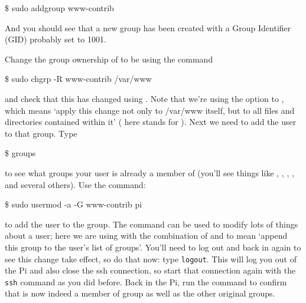 \begin{ttoutenv}
\$ sudo addgroup www-contrib
\end{ttoutenv}

And you should see that a new group has been created with a Group
Identifier (GID) probably set to 1001.

Change the group ownership of  to be
 using the command

\begin{ttoutenv}
\$ sudo chgrp -R www-contrib /var/www
\end{ttoutenv}

and check that this has changed using . Note that we're
using the  option to , which means `apply
this change not only to /var/www itself, but to all files and
directories contained within it' ( here stands for
). Next we need to add the 
user to that group. Type

\begin{ttoutenv}
\$ groups
\end{ttoutenv}

to see what groups your user is already a member of (you'll see things
like , , , ,
 and several others). Use the command:

\begin{ttoutenv}
\$ sudo usermod -a -G www-contrib pi
\end{ttoutenv}

to add the  user to the  group. The
 command can be used to modify lots of things
about a user; here we are using with the combination of  and
 to mean `append this group to the user's list of
groups'. You'll need to log out and back in again to see this change
take effect, so do that now: type \verb+logout+. This will log you out
of the Pi and also close the ssh connection, so start that connection
again with the \verb+ssh+ command as you did before. Back in the Pi,
run the  command to confirm that  is now
indeed a member of group  as well as the other
original groups.


